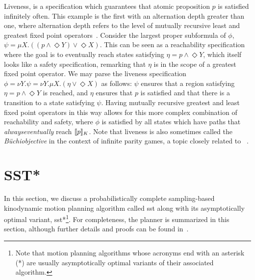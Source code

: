 \begin{enumerate}[label = (\roman*)]
    Liveness, is a specification which guarantees that atomic proposition $p$ is satisfied infinitely often. This example is the first with an alternation depth greater than one, where alternation depth refers to the level of mutually recursive least and greatest fixed point operators~\cite{Wilke2001}.
    Consider the largest proper subformula of $\phi$, $\psi = {\mu X.((p \land \Diamond Y) \lor \Diamond X)}$. This can be seen as a reachability specification where the goal is to eventually reach states satisfying $\eta = p \land \Diamond Y$, which itself looks like a safety specification, remarking that $\eta$ is in the scope of a greatest fixed point operator. We may parse the liveness specification $\phi = {\nu Y.\psi} = {\nu Y.\mu X.(\eta \lor \Diamond X)}$ as follows: $\psi$ ensures that a region satisfying ${\eta = p \land \Diamond Y}$ is reached, and $\eta$ ensures that $p$ is satisfied and that there is a transition to a state satisfying $\psi$. Having mutually recursive greatest and least fixed point operators in this way allows for this more complex combination of reachability and safety, where $\phi$ is satisfied by all states which have paths that {\it always\/eventually} reach ${\llbracket}{} p {\rrbracket}{}_K$. Note that liveness is also sometimes called the {\it B\"uchi\/objective} in the context of infinite parity games, a topic closely related to \mucalc{}~\cite{Emerson1991,Karaman2012,Wilke2001}.
\end{enumerate}

\section{SST*}\label{prelims:sst}

In this section, we discuss a probabilistically complete sampling-based kinodynamic motion planning algorithm called \gls{sst} along with its asymptotically optimal variant, \gls{sst}*\footnote{Note that motion planning algorithms whose acronyms end with an asterisk (*) are usually asymptotically optimal variants of their associated algorithm.}. For completeness, the planner is summarized in this section, although further details and proofs can be found in~\cite{Li2016}.

